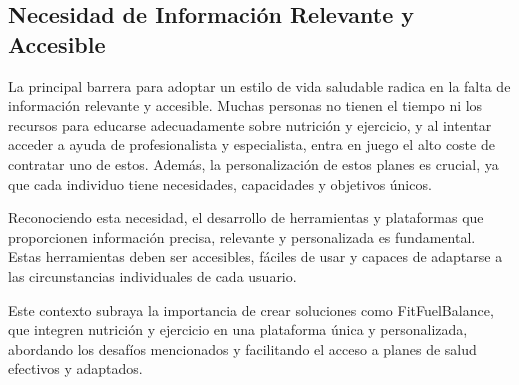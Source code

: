 \begin{description}
  \subsection{Necesidad de Información Relevante y Accesible}
  La principal barrera para adoptar un estilo de vida saludable radica en la falta de información relevante y accesible. Muchas personas no tienen el tiempo ni los recursos para educarse adecuadamente sobre nutrición y ejercicio, y al intentar acceder a ayuda de profesionalista y especialista, entra en juego el alto coste de contratar uno de estos. Además, la personalización de estos planes es crucial, ya que cada individuo tiene necesidades, capacidades y objetivos únicos.

Reconociendo esta necesidad, el desarrollo de herramientas y plataformas que proporcionen información precisa, relevante y personalizada es fundamental. Estas herramientas deben ser accesibles, fáciles de usar y capaces de adaptarse a las circunstancias individuales de cada usuario.

Este contexto subraya la importancia de crear soluciones como FitFuelBalance, que integren nutrición y ejercicio en una plataforma única y personalizada, abordando los desafíos mencionados y facilitando el acceso a planes de salud efectivos y adaptados.
\end{description}